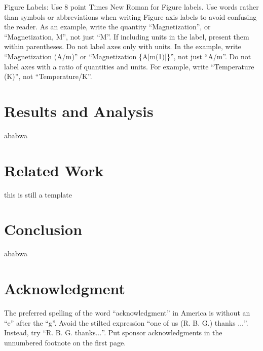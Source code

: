 \documentclass[conference]{IEEEtran}
\begin{document}
Figure Labels: Use 8 point Times New Roman for Figure labels. Use words 
rather than symbols or abbreviations when writing Figure axis labels to 
avoid confusing the reader. As an example, write the quantity 
``Magnetization'', or ``Magnetization, M'', not just ``M''. If including 
units in the label, present them within parentheses. Do not label axes only 
with units. In the example, write ``Magnetization (A/m)'' or ``Magnetization 
\{A[m(1)]\}'', not just ``A/m''. Do not label axes with a ratio of 
quantities and units. For example, write ``Temperature (K)'', not 
``Temperature/K''.

\section{Results and Analysis}
ababwa

\section{Related Work}
this is still a template

\section{Conclusion}
ababwa

\section*{Acknowledgment}

The preferred spelling of the word ``acknowledgment'' in America is without 
an ``e'' after the ``g''. Avoid the stilted expression ``one of us (R. B. 
G.) thanks $\ldots$''. Instead, try ``R. B. G. thanks$\ldots$''. Put sponsor 
acknowledgments in the unnumbered footnote on the first page.
\end{document}

